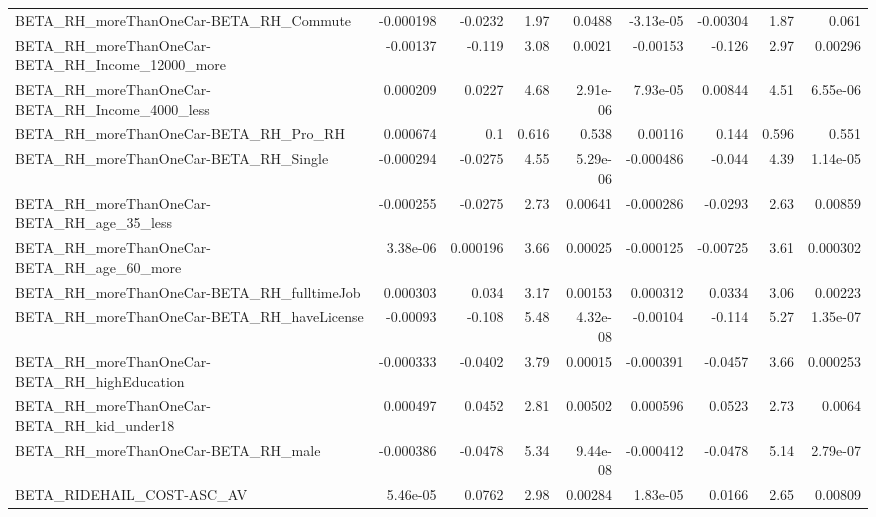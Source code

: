 \begin{tabular}{lrrrrrrrr}
BETA\_RH\_moreThanOneCar-BETA\_RH\_Commute             &   -0.000198 &      -0.0232 &      1.97 &   0.0488 &  -3.13e-05 &    -0.00304 &         1.87 &         0.061 \\
BETA\_RH\_moreThanOneCar-BETA\_RH\_Income\_12000\_more   &    -0.00137 &       -0.119 &      3.08 &   0.0021 &   -0.00153 &      -0.126 &         2.97 &       0.00296 \\
BETA\_RH\_moreThanOneCar-BETA\_RH\_Income\_4000\_less    &    0.000209 &       0.0227 &      4.68 & 2.91e-06 &   7.93e-05 &     0.00844 &         4.51 &      6.55e-06 \\
BETA\_RH\_moreThanOneCar-BETA\_RH\_Pro\_RH              &    0.000674 &          0.1 &     0.616 &    0.538 &    0.00116 &       0.144 &        0.596 &         0.551 \\
BETA\_RH\_moreThanOneCar-BETA\_RH\_Single              &   -0.000294 &      -0.0275 &      4.55 & 5.29e-06 &  -0.000486 &      -0.044 &         4.39 &      1.14e-05 \\
BETA\_RH\_moreThanOneCar-BETA\_RH\_age\_35\_less         &   -0.000255 &      -0.0275 &      2.73 &  0.00641 &  -0.000286 &     -0.0293 &         2.63 &       0.00859 \\
BETA\_RH\_moreThanOneCar-BETA\_RH\_age\_60\_more         &    3.38e-06 &     0.000196 &      3.66 &  0.00025 &  -0.000125 &    -0.00725 &         3.61 &      0.000302 \\
BETA\_RH\_moreThanOneCar-BETA\_RH\_fulltimeJob         &    0.000303 &        0.034 &      3.17 &  0.00153 &   0.000312 &      0.0334 &         3.06 &       0.00223 \\
BETA\_RH\_moreThanOneCar-BETA\_RH\_haveLicense         &    -0.00093 &       -0.108 &      5.48 & 4.32e-08 &   -0.00104 &      -0.114 &         5.27 &      1.35e-07 \\
BETA\_RH\_moreThanOneCar-BETA\_RH\_highEducation       &   -0.000333 &      -0.0402 &      3.79 &  0.00015 &  -0.000391 &     -0.0457 &         3.66 &      0.000253 \\
BETA\_RH\_moreThanOneCar-BETA\_RH\_kid\_under18         &    0.000497 &       0.0452 &      2.81 &  0.00502 &   0.000596 &      0.0523 &         2.73 &        0.0064 \\
BETA\_RH\_moreThanOneCar-BETA\_RH\_male                &   -0.000386 &      -0.0478 &      5.34 & 9.44e-08 &  -0.000412 &     -0.0478 &         5.14 &      2.79e-07 \\
BETA\_RIDEHAIL\_COST-ASC\_AV                          &    5.46e-05 &       0.0762 &      2.98 &  0.00284 &   1.83e-05 &      0.0166 &         2.65 &       0.00809 \\

\end{tabular}
